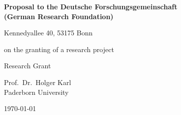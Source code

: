 {

  \vspace*{20ex}

  \begin{center}
  \large

  {\bfseries Proposal to the Deutsche Forschungsgemeinschaft\\(German Research Foundation)}

  Kennedyallee 40, 53175 Bonn

  \vspace{4ex}

  on the granting of a research project

  \vspace{9ex}

  \begin{bfseries}
    \project 
  \end{bfseries}

  \medskip

	Research Grant

  \vspace{9ex}

  Prof.\ Dr.\ Holger Karl \\
  Paderborn University 
	 
	\vspace{9ex}

	\today
  \end{center}
}


